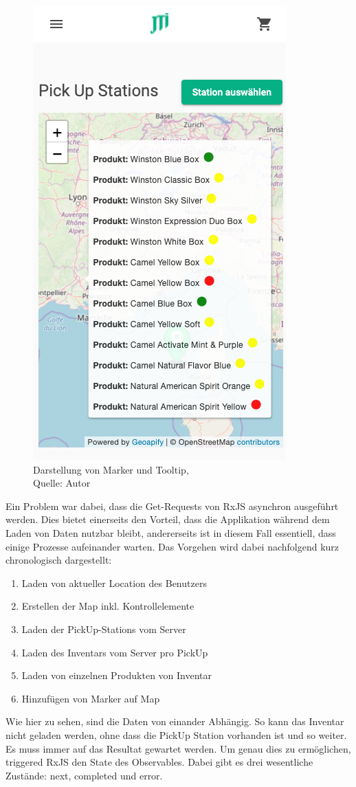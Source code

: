  \begin{figure}[H]
 	\centering
 	\includegraphics[scale=0.5]{images/tooltipCard.PNG}
 	\caption[Darstellung von Marker und Tooltip]{Darstellung von Marker und Tooltip,\\ Quelle: Autor}
 	\label{img: tooltipCard}
 \end{figure} 
 
 Ein Problem war dabei, dass die Get-Requests von RxJS asynchron ausgeführt werden. Dies bietet einerseits den Vorteil, dass die Applikation während dem Laden von Daten nutzbar bleibt, andererseits ist in diesem Fall essentiell, dass einige Prozesse aufeinander warten. Das Vorgehen wird dabei nachfolgend kurz chronologisch dargestellt: 
 \begin{enumerate}
 	\item Laden von aktueller Location des Benutzers
 	\item Erstellen der Map inkl. Kontrollelemente
 	\item Laden der PickUp-Stations vom Server
 	\item Laden des Inventars vom Server pro PickUp
 	\item Laden von einzelnen Produkten von Inventar
 	\item Hinzufügen von Marker auf Map 
\end{enumerate}
Wie hier zu sehen, sind die Daten von einander Abhängig. So kann das Inventar nicht geladen werden, ohne dass die PickUp Station vorhanden ist und so weiter. Es muss immer auf das Resultat gewartet werden. Um genau dies zu ermöglichen, triggered RxJS den State des Observables. Dabei gibt es drei wesentliche Zustände: next, completed und error. 


